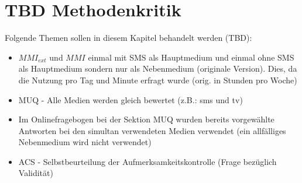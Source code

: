 \section{TBD Methodenkritik}\label{section.diskussion.methodenkritik}
Folgende Themen sollen in diesem Kapitel behandelt werden (TBD):
\begin{itemize}
    \item $MMI_{ext}$ und $MMI$ einmal mit SMS als Hauptmedium und einmal ohne SMS als Hauptmedium sondern nur als Nebenmedium (originale Version). Dies, da die Nutzung pro Tag und Minute erfragt wurde (orig. in Stunden pro Woche)
    \item MUQ - Alle Medien werden gleich bewertet (z.B.: sms und tv)
    \item Im Onlinefragebogen bei der Sektion MUQ wurden bereits vorgewählte Antworten bei den simultan verwendeten Medien verwendet (ein allfälliges Nebenmedium wird nicht verwendet)
    \item ACS - Selbstbeurteilung der Aufmerksamkeitskontrolle (Frage bezüglich Validität)
\end{itemize}


